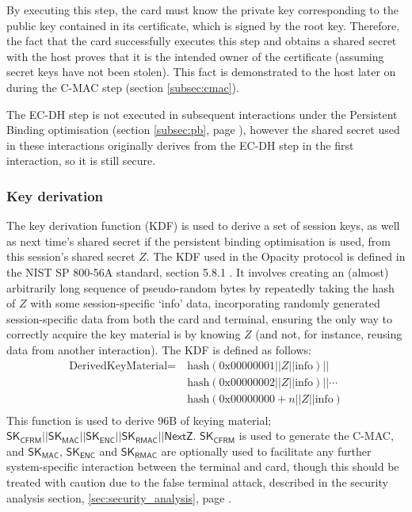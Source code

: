 \documentclass[12pt,a4paper]{article}
\begin{document}
By executing this step, the card must know the private key corresponding to the public key contained in its certificate, which is signed by the root key. Therefore, the fact that the card successfully executes this step and obtains a shared secret with the host proves that it is the intended owner of the certificate (assuming secret keys have not been stolen). This fact is demonstrated to the host later on during the C-MAC step (section \ref{subsec:cmac}).

The EC-DH step is not executed in subsequent interactions under the Persistent Binding optimisation (section \ref{subsec:pb}, page \pageref{subsec:pb}), however the shared secret used in these interactions originally derives from the EC-DH step in the first interaction, so it is still secure.



\subsubsection{Key derivation}
\label{subsec:kdf}

The key derivation function (KDF) is used to derive a set of session keys, as well as next time's shared secret if the persistent binding optimisation is used, from this session's shared secret $Z$. The KDF used in the Opacity protocol is defined in the NIST SP 800-56A standard, section 5.8.1 \cite{TODO}. It involves creating an (almost) arbitrarily long sequence of pseudo-random bytes by repeatedly taking the hash of $Z$ with some session-specific `info' data, incorporating randomly generated session-specific data from both the card and terminal, ensuring the only way to correctly acquire the key material is by knowing $Z$ (and not, for instance, reusing data from another interaction). The KDF is defined as follows:
\begin{align*}
\text{DerivedKeyMaterial} =\ &\text{hash}(0\text{x}00000001||Z||\text{info})||\\
&\text{hash}(0\text{x}00000002||Z||\text{info})|| \cdots\\
&\text{hash}(0\text{x}00000000+n||Z||\text{info})\\
\end{align*}
This function is used to derive 96B of keying material; $\mathsf{SK}_\mathsf{CFRM}||\mathsf{SK}_\mathsf{MAC}||\mathsf{SK}_\mathsf{ENC}||\mathsf{SK}_\mathsf{RMAC}||\mathsf{NextZ}$. $\mathsf{SK}_\mathsf{CFRM}$ is used to generate the C-MAC, and $\mathsf{SK}_\mathsf{MAC}$, $\mathsf{SK}_\mathsf{ENC}$ and $\mathsf{SK}_\mathsf{RMAC}$ are optionally used to facilitate any further system-specific interaction between the terminal and card, though this should be treated with caution due to the false terminal attack, described in the security analysis section, \ref{sec:security_analysis}, page \pageref{sec:security_analysis}.
\end{document}
